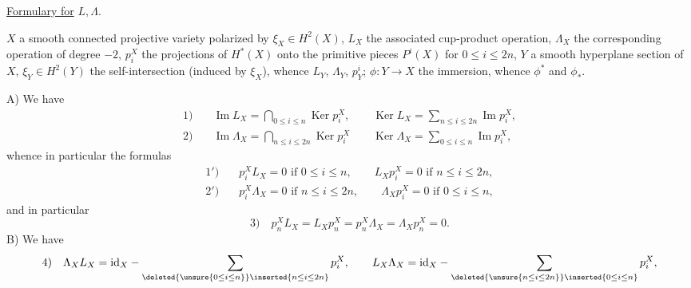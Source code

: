 \uline{Formulary for} $L,\Lambda$.

$X$ a smooth connected projective variety polarized by $\xi_X\in H^2(X)$, $L_X$ the associated cup-product operation, $\Lambda_X$ the corresponding operation of degree $-2$, $p_i^X$ the projections of $H^*(X)$ onto the primitive pieces $P^i(X)$ for $0\leq i\leq2n$, $Y$ a smooth hyperplane section of $X$, $\xi_Y\in H^2(Y)$ the self-intersection (induced by $\xi_X$), whence $L_Y$, $\Lambda_Y$, $p_Y^i$; $\phi:Y\to X$ the immersion, whence $\phi^*$ and $\phi_*$.

A) We have
\[
\begin{aligned}
1)\quad&\operatorname{Im}L_X=\bigcap_{0\leq i\leq n}\operatorname{Ker}p_i^X,\qquad
\operatorname{Ker}L_X=\sum_{n\leq i\leq2n}\operatorname{Im}p_i^X,\\
2)\quad&\operatorname{Im}\Lambda_X=\bigcap_{n\leq i\leq2n}\operatorname{Ker}p_i^X\qquad
\operatorname{Ker}\Lambda_X=\sum_{0\leq i\leq n}\operatorname{Im}p_i^X,
\end{aligned}
\]
whence in particular the formulas
\[
\begin{aligned}
1')\quad&p_i^XL_X=0\text{ if }0\leq i\leq n,\qquad L_Xp_i^X=0\text{ if }n\leq i\leq2n,\\
2')\quad&p_i^X\Lambda_X=0\text{ if }n\leq i\leq2n,\qquad\Lambda_Xp_i^X=0\text{ if }0\leq i\leq n,
\end{aligned}
\]
and in particular
\[
3)\quad p_n^XL_X=L_Xp_n^X=p_n^X\Lambda_X=\Lambda_Xp_n^X=0.
\]
B) We have
\[
4)\quad\Lambda_XL_X=\mathrm{id}_X-\sum_{\deleted{\unsure{0\leq i\leq n}}\inserted{n\leq i\leq2n}}p_i^X,
\qquad L_X\Lambda_X=\mathrm{id}_X-\sum_{\deleted{\unsure{n\leq i\leq2n}}\inserted{0\leq i\leq n}}p_i^X,
\]

